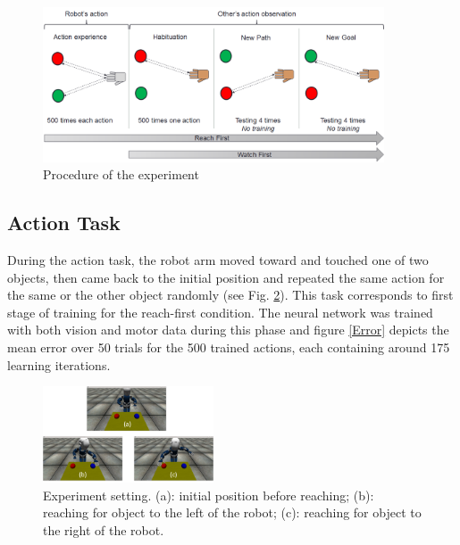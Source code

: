 \documentclass[conference]{IEEEtran}
\begin{document}
\begin{figure}
\centering
\includegraphics[width=0.9\textwidth,natwidth=700,natheight=450]{Figure2.png}
\caption{Procedure of the experiment}
\label{experiment}
\end{figure}

\subsection{Action Task}
During the action task, the robot arm moved toward and touched one of two objects, then came back to the initial position and repeated the same action for the same or the other object randomly (see Fig. \ref{iCub}). This task corresponds to first stage of training for the reach-first condition. The neural network was trained with both vision and motor data during this phase and figure \ref{Error} depicts the mean error over 50 trials for the 500 trained actions, each containing around 175 learning iterations. 

\begin{figure}
\centering
\includegraphics[width=0.45\textwidth,natwidth=700,natheight=450]{Simulator.png}
\caption{Experiment setting. (a): initial position before reaching; (b): reaching for object to the left of the robot; (c): reaching for object to the right of the robot.}
\label{iCub} 
\end{figure}
\end{document}
